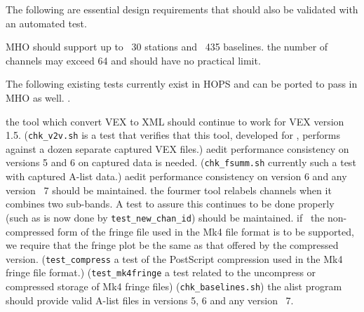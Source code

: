 The following are essential design requirements that should also
be validated with an automated test.

\begin{description}
 \ac{MHO} should support up to
    \TBD~30 stations and \TBD~435 baselines.
 the number of \acsp{channel} may exceed 64 and should
    have no practical limit.
\end{description}

The following existing tests currently exist in \ac{HOPS}
and can be ported to pass in \ac{MHO} as well.
.

\begin{description}
 the  tool which convert \acs{VEX} to \acs{XML}
    should continue to work for \acs{VEX} version 1.5.
    (\texttt{chk\_v2v.sh} is a test that verifies that this tool,
    developed for , performs against a dozen separate
    captured \acs{VEX} files.)
 \ac{aedit} performance consistency on versions 5 and 6
    on captured data is needed.  (\texttt{chk\_fsumm.sh} currently
    such a test with captured \ac{A-list} data.)
 \ac{aedit} performance consistency on version 6 and
    any version \TBD~7 should be maintained.
 the \acs{fourmer} tool relabels channels when it combines
    two sub-bands.  A test to assure this continues to be done
    properly (such as is now done by \texttt{test\_new\_chan\_id})
    should be maintained.
 if \TBD~the non-compressed form of the fringe file used in
    the \acs{Mk4} file format is to be supported, we require that the
    fringe plot be the same as that offered by the compressed version.
    (\texttt{test\_compress} a test of the \ac{PostScript}
    compression used in the \ac{Mk4} fringe file format.)
 
    (\texttt{test\_mk4fringe} a test related to the uncompress
    or compressed storage of \ac{Mk4} fringe files)
 
    (\texttt{chk\_baselines.sh})
 the \acs{alist} program should provide valid \acs{A-list}
    files in versions 5, 6 and any version \TBD~7.

\end{description}

